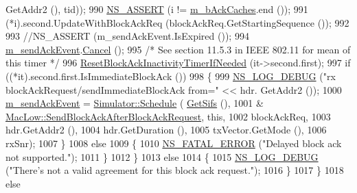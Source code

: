 \begin{DoxyCode}
      GetAddr2 (), tid));
990               \hyperlink{assert_8h_a6dccdb0de9b252f60088ce281c49d052}{NS\_ASSERT} (i != \hyperlink{classns3_1_1MacLow_a1a2b5d95cae95e9b99e6508d7d350b47}{m\_bAckCaches}.end ());
991               (*i).second.UpdateWithBlockAckReq (blockAckReq.GetStartingSequence ());
992 
993               \textcolor{comment}{//NS\_ASSERT (m\_sendAckEvent.IsExpired ());}
994               \hyperlink{classns3_1_1MacLow_a35ee7cfc983896c26c514bade14b3197}{m\_sendAckEvent}.\hyperlink{classns3_1_1EventId_a993ae94e48e014e1afd47edb16db7a11}{Cancel} ();
995               \textcolor{comment}{/* See section 11.5.3 in IEEE 802.11 for mean of this timer */}
996               \hyperlink{classns3_1_1MacLow_aafa012c5d2dde80484d6546c802f02f8}{ResetBlockAckInactivityTimerIfNeeded} (it->second.first);
997               \textcolor{keywordflow}{if} ((*it).second.first.IsImmediateBlockAck ())
998                 \{
999                   \hyperlink{group__logging_ga413f1886406d49f59a6a0a89b77b4d0a}{NS\_LOG\_DEBUG} (\textcolor{stringliteral}{"rx blockAckRequest/sendImmediateBlockAck from="} << hdr.
      GetAddr2 ());
1000                   \hyperlink{classns3_1_1MacLow_a35ee7cfc983896c26c514bade14b3197}{m\_sendAckEvent} = \hyperlink{classns3_1_1Simulator_a671882c894a08af4a5e91181bf1eec13}{Simulator::Schedule} (
      \hyperlink{classns3_1_1MacLow_a9107421b7ed9f291d60b8344b4918e56}{GetSifs} (),
1001                                                         &
      \hyperlink{classns3_1_1MacLow_a84b96c0cc6f32fca28576ec4df6a0853}{MacLow::SendBlockAckAfterBlockAckRequest}, \textcolor{keyword}{this},
1002                                                         blockAckReq,
1003                                                         hdr.GetAddr2 (),
1004                                                         hdr.GetDuration (),
1005                                                         txVector.GetMode (),
1006                                                         rxSnr);
1007                 \}
1008               \textcolor{keywordflow}{else}
1009                 \{
1010                   \hyperlink{group__fatal_ga5131d5e3f75d7d4cbfd706ac456fdc85}{NS\_FATAL\_ERROR} (\textcolor{stringliteral}{"Delayed block ack not supported."});
1011                 \}
1012             \}
1013           \textcolor{keywordflow}{else}
1014             \{
1015               \hyperlink{group__logging_ga413f1886406d49f59a6a0a89b77b4d0a}{NS\_LOG\_DEBUG} (\textcolor{stringliteral}{"There's not a valid agreement for this block ack request."});
1016             \}
1017         \}
1018       \textcolor{keywordflow}{else}

\end{DoxyCode}
